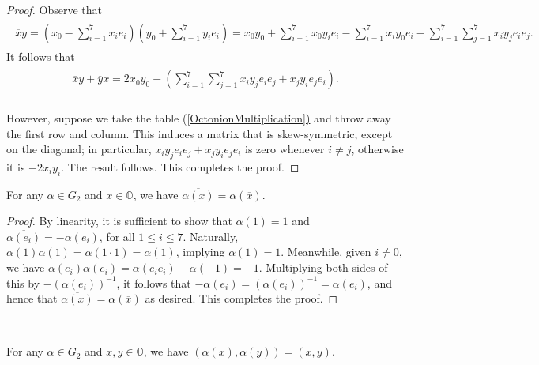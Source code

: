 \noindent\begin{proof} Observe that
\begin{align*}
\begin{split}
\overline{x}y = \!\left(x_0 - \sum_{i=1}^7{x_ie_i}\right)\!\!\left(y_0 + \sum_{i=1}^7{y_ie_i}\right)\! = x_0y_0 + \sum_{i=1}^7{x_0y_ie_i} - \sum_{i=1}^7{x_iy_0e_i} - \sum_{i=1}^7{\sum_{j=1}^7{x_iy_je_ie_j}}.
\end{split}
\end{align*}
\noindent It follows that
\begin{align*}
\begin{split}
\overline{x}y + \overline{y}x = 2x_0y_0 - \!\left(\sum_{i=1}^7{\sum_{j=1}^7{x_iy_je_ie_j + x_jy_ie_je_i}}\right)\!.
\end{split}
\end{align*}
\noindent\\[-0.5\linespacing] However, suppose we take the table \hyperref[OctonionMultiplication]{(\ref*{OctonionMultiplication})} and throw away the first row and column. This induces a matrix that is skew-symmetric, except on the diagonal; in particular, $x_iy_je_ie_j + x_jy_ie_je_i$ is zero whenever $i \neq j$, otherwise it is $-2x_iy_i$. The result follows. This completes the proof.
\end{proof}\newpage

\noindent\begin{lemma}\label{Conjugation} For any $\alpha \in G_2$ and $x \in \mathbb{O}$, we have $\overline{\alpha(x)} = \alpha(\overline{x})$.\\
\end{lemma}

\noindent\begin{proof} By linearity, it is sufficient to show that $\alpha(1) = 1$ and $\overline{\alpha(e_i)} = -\alpha(e_i)$, for all $1 \leq i \leq 7$. Naturally, $\alpha(1)\alpha(1) = \alpha(1 \cdot 1) = \alpha(1)$, implying $\alpha(1) = 1$. Meanwhile, given $i \neq 0$, we have $\alpha(e_i)\alpha(e_i) = \alpha(e_ie_i) - \alpha(-1) = -1$. Multiplying both sides of this by $-(\alpha(e_i))^{-1}$, it follows that $-\alpha(e_i) = (\alpha(e_i))^{-1} = \overline{\alpha(e_i)}$, and hence that $\overline{\alpha(x)} = \alpha(\overline{x})$ as desired. This completes the proof.
\end{proof}\\

\noindent\begin{lemma}\label{PreservesInnerProduct} For any $\alpha \in G_2$ and $x, y \in \mathbb{O}$, we have $(\alpha(x), \alpha(y)) = (x, y)$.\\
\end{lemma}

